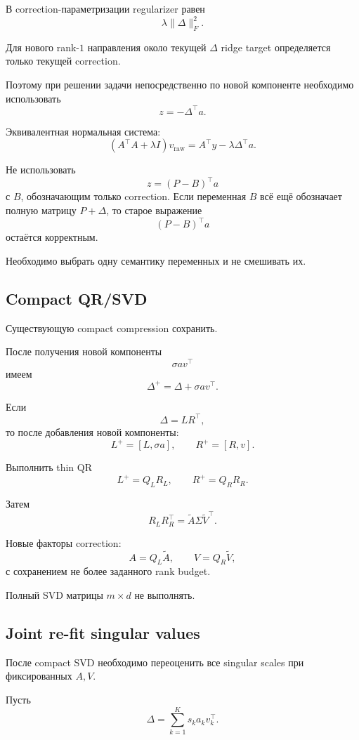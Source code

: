 В correction-параметризации regularizer равен
\[
    \lambda\|\Delta\|_F^2.
\]

Для нового rank-$1$ направления около текущей $\Delta$ ridge target
определяется только текущей correction.

Поэтому при решении задачи непосредственно по новой компоненте
необходимо использовать
\[
\boxed{
    z
    =
    -\Delta^\top a.
}
\]

Эквивалентная нормальная система:
\[
    (A^\top A+\lambda I)v_{\mathrm{raw}}
    =
    A^\top y
    -
    \lambda\Delta^\top a.
\]

Не использовать
\[
    z=(P-B)^\top a
\]
с $B$, обозначающим только correction.
Если переменная $B$ всё ещё обозначает полную матрицу $P+\Delta$,
то старое выражение
\[
    (P-B)^\top a
\]
остаётся корректным.

Необходимо выбрать одну семантику переменных и не смешивать их.

\subsection{Compact QR/SVD}

Существующую compact compression сохранить.

После получения новой компоненты
\[
    \sigma av^\top
\]
имеем
\[
    \Delta^+
    =
    \Delta+\sigma av^\top.
\]

Если
\[
    \Delta=LR^\top,
\]
то после добавления новой компоненты:
\[
    L^+
    =
    [L,\sigma a],
    \qquad
    R^+
    =
    [R,v].
\]

Выполнить thin QR
\[
    L^+=Q_LR_L,
    \qquad
    R^+=Q_RR_R.
\]

Затем
\[
    R_LR_R^\top
    =
    \widetilde A
    \Sigma
    \widetilde V^\top.
\]

Новые факторы correction:
\[
\boxed{
    A
    =
    Q_L\widetilde A,
    \qquad
    V
    =
    Q_R\widetilde V,
}
\]
с сохранением не более заданного rank budget.

Полный SVD матрицы $m\times d$ не выполнять.

\subsection{Joint re-fit singular values}

После compact SVD необходимо переоценить все singular scales
при фиксированных $A,V$.

Пусть
\[
    \Delta
    =
    \sum_{k=1}^{K}
    s_ka_kv_k^\top.
\]

